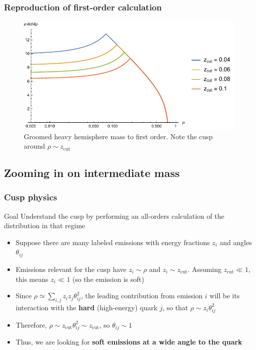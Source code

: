 \documentclass{beamer}
\newcommand{\zcut}{z_\mathrm{cut}}
\begin{document}
	\begin{frame}
		\frametitle{Reproduction of first-order calculation}

		\begin{figure}
			\includegraphics[width=\columnwidth]{figures/first_reproduction.pdf}

			\caption{Groomed heavy hemisphere mass to first order. Note the cusp around $\rho \sim \zcut$}
		\end{figure}
	\end{frame}

\subsection{Zooming in on intermediate mass}
	\begin{frame}
		\frametitle{Cusp physics}

		\begin{block}{Goal}
			Understand the cusp by performing an all-orders calculation of the distribution in that regime
		\end{block}

		\begin{itemize}
			\item Suppose there are many labeled emissions with energy fractions $z_i$ and angles $\theta_{ij}$

			\item Emissions relevant for the cusp have $z_i \sim \rho$ and $z_i \sim \zcut$. Assuming $\zcut \ll 1$, this means $z_i \ll 1$ (so the emission is soft)

			\item Since $\rho \simeq \sum_{i,j} z_i z_j \theta_{ij}^2$, the leading contribution from emission $i$ will be its interaction with the \textbf{hard} (high-energy) quark $j$, so that $\rho \sim z_i \theta_{ij}^2$

			\item Therefore, $\rho \sim \zcut \theta_{ij}^2 \sim \zcut$, so $\theta_{ij} \sim 1$

			\item Thus, we are looking for \textbf{soft emissions at a wide angle to the quark}
		\end{itemize}
	\end{frame}
\end{document}
